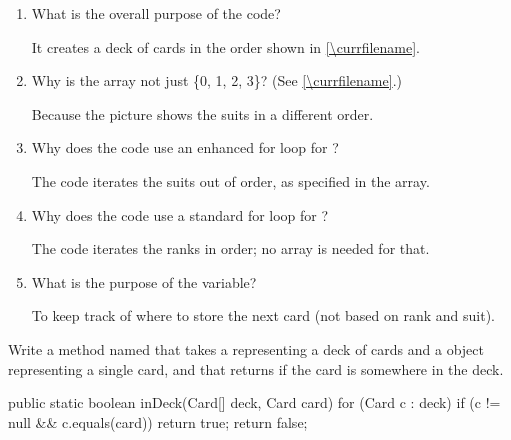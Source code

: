 \vspace{-1ex}
\begin{enumerate}

\item What is the overall purpose of the code?
\begin{answer}[1em]
It creates a deck of cards in the order shown in \ref{\currfilename}.
\end{answer}

\item Why is the  array not just \{0, 1, 2, 3\}? (See \ref{\currfilename}.)
\begin{answer}[1em]
Because the picture shows the suits in a different order.
\end{answer}

\item Why does the code use an enhanced for loop for ?
\begin{answer}[1em]
The code iterates the suits out of order, as specified in the array.
\end{answer}

\item Why does the code use a standard for loop for ?
\begin{answer}[1em]
The code iterates the ranks in order; no array is needed for that.
\end{answer}

\item What is the purpose of the  variable?
\begin{answer}[1em]
To keep track of where to store the next card (not based on rank and suit).
\end{answer}

\end{enumerate}
\vspace{-1ex}


\Q \label{search}
Write a method named  that takes a  representing a deck of cards and a  object representing a single card, and that returns  if the card is somewhere in the deck.

\begin{answer}[10em]
\begin{javaans}
public static boolean inDeck(Card[] deck, Card card) {
    for (Card c : deck) {
        if (c != null && c.equals(card)) {
            return true;
        }
    }
    return false;
}
\end{javaans}
\end{answer}


